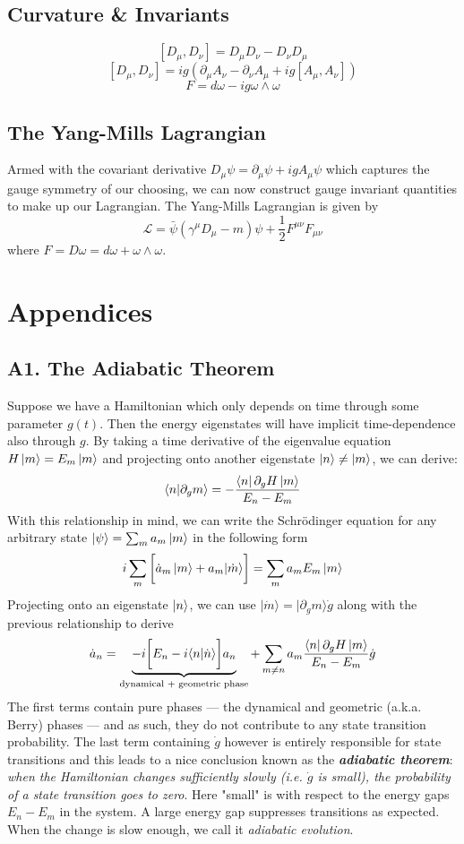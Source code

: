 \documentclass[onecolumn]{gwclass}
\renewcommand{\t}[1]{\text{#1}}
\begin{document}
\subsection{Curvature \& Invariants}
$$  [D_\mu, D_\nu] = D_\mu D_\nu - D_\nu D_\mu $$
$$ [D_\mu, D_\nu] = ig(\partial_\mu A_\nu - \partial_\nu A_\mu +ig[A_\mu, A_\nu]) $$
$$ F = d\omega -ig\omega\wedge \omega $$


\subsection{The Yang-Mills Lagrangian}
Armed with the covariant derivative $D_\mu\psi = \partial_\mu\psi + igA_\mu\psi$ which captures the gauge symmetry of our choosing, we can now construct gauge invariant quantities to make up our Lagrangian. The Yang-Mills Lagrangian is given by
$$ \mathscr{L} = \bar\psi(\gamma^\mu D_\mu - m)\psi + \frac{1}{2}F^{\mu\nu}F_{\mu\nu} $$
where $F=D\omega = d\omega + \omega\wedge \omega$.





\newpage
\section{Appendices}

\subsection{A1. The Adiabatic Theorem}
Suppose we have a Hamiltonian which only depends on time through some parameter $g(t)$. Then the energy eigenstates will have implicit time-dependence also through $g$. By taking a time derivative of the eigenvalue equation $H\ket{m}=E_m\ket{m}$ and projecting onto another eigenstate $\ket{n}\neq \ket{m}$, we can derive:
$$ \bra{n}\ket{\partial_g m} = -\frac{\bra{n}\partial_g H \ket{m}}{E_n - E_m} $$
With this relationship in mind, we can write the Schr\"odinger equation for any arbitrary state $\ket{\psi}=\sum_m a_m\ket{m}$ in the following form
$$  i\sum_m \bigg[\dot{a}_m\ket{m} + a_m |\dot{m}\rangle \bigg]= \sum_m a_m E_m\ket{m} $$
Projecting onto an eigenstate $\ket{n}$, we can use $|\dot{m}\rangle=|\partial_gm\rangle \dot{g}$ along with the previous relationship to derive
$$  \dot{a}_n = \underbrace{-i\bigg[E_n  - i\langle n|\dot{n}\rangle\bigg] a_n}_{\t{dynamical + geometric phase}} + \sum_{m\neq n} a_m \frac{\bra{n}\partial_gH\ket{m}}{E_n-E_m}\dot{g}  $$
The first terms contain pure phases --- the dynamical and geometric (a.k.a. Berry) phases --- and as such, they do not contribute to any state transition probability. The last term containing $\dot{g}$ however is entirely responsible for state transitions and this leads to a nice conclusion known as the \textbf{\emph{adiabatic theorem}}: \emph{when the Hamiltonian changes sufficiently slowly (i.e. $\dot{g}$ is small), the probability of a state transition goes to zero}. Here "small" is with respect to the energy gaps $E_n-E_m$ in the system. A large energy gap suppresses transitions as expected. When the change is slow enough, we call it \emph{adiabatic evolution}.
\\
\end{document}

